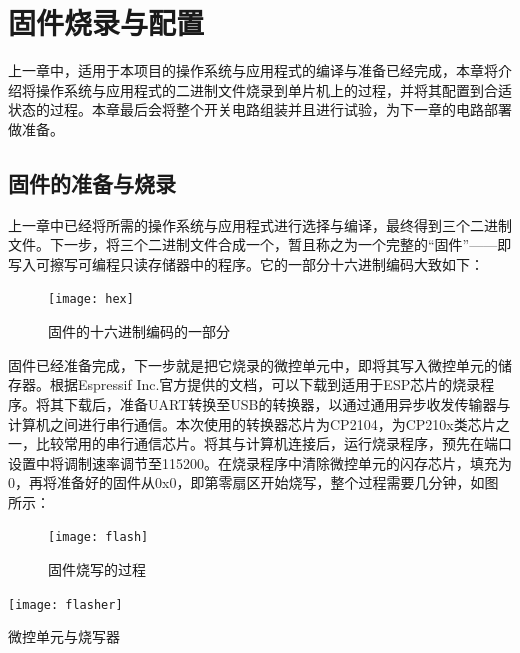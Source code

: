 \setchapterpreamble[u]{\margintoc}
\chapter{固件烧录与配置}

\setlength\parindent{2em} 上一章中，适用于本项目的操作系统与应用程式的编译与准备已经完成，本章将介绍将操作系统与应用程式的二进制文件烧录到单片机上的过程，并将其配置到合适状态的过程。本章最后会将整个开关电路组装并且进行试验，为下一章的电路部署做准备。

\section{固件的准备与烧录}

\setlength\parindent{2em} 上一章中已经将所需的操作系统与应用程式进行选择与编译，最终得到三个二进制文件。下一步，将三个二进制文件合成一个，暂且称之为一个完整的“固件”——即写入可擦写可编程只读存储器中的程序。它的一部分十六进制编码大致如下：

\begin{figure}[h!]
	\texttt{[image: hex]}
	\caption[hex]{固件的十六进制编码的一部分}
\end{figure}

\par 固件已经准备完成，下一步就是把它烧录的微控单元中，即将其写入微控单元的储存器。根据Espressif Inc.官方提供的文档，可以下载到适用于ESP芯片的烧录程序。将其下载后，准备UART转换至USB的转换器，以通过通用异步收发传输器与计算机之间进行串行通信。本次使用的转换器芯片为CP2104，为CP210x类芯片之一，比较常用的串行通信芯片。将其与计算机连接后，运行烧录程序，预先在端口设置中将调制速率调节至115200。在烧录程序中清除微控单元的闪存芯片，填充为0，再将准备好的固件从0x0，即第零扇区开始烧写，整个过程需要几分钟，如图所示：

\begin{figure}[h!]
	\texttt{[image: flash]}
	\caption[flash]{固件烧写的过程}
\end{figure}


\begin{marginfigure}[0cm]
	\texttt{[image: flasher]}
	\caption[flasher]{微控单元与烧写器}
\end{marginfigure}

